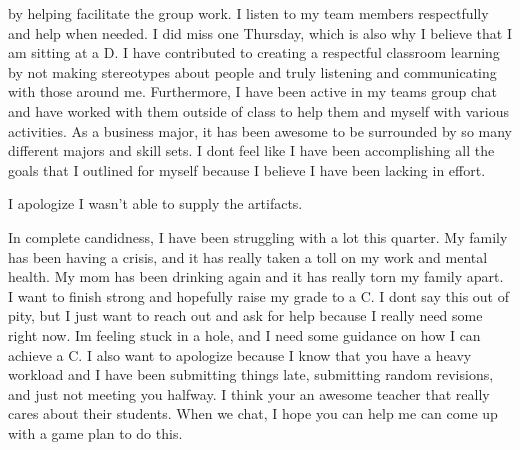 \documentclass[
  letterpaper,
  DIV=11,
  numbers=noendperiod]{scrartcl}
\begin{document}
by helping facilitate the group work. I listen to my team members
respectfully and help when needed. I did miss one Thursday, which is
also why I believe that I am sitting at a D. I have contributed to
creating a respectful classroom learning by not making stereotypes about
people and truly listening and communicating with those around me.
Furthermore, I have been active in my teams group chat and have worked
with them outside of class to help them and myself with various
activities. As a business major, it has been awesome to be surrounded by
so many different majors and skill sets. I don\textquotesingle t feel
like I have been accomplishing all the goals that I outlined for myself
because I believe I have been lacking in effort.

I apologize I wasn't able to supply the artifacts. ~

In complete candidness, I have been struggling with a lot this quarter.
My family has been having a crisis, and it has really taken a toll on my
work and mental health. My mom has been drinking again and it has really
torn my family apart. I want to finish strong and hopefully raise my
grade to a C. I don\textquotesingle t say this out of pity, but I just
want to reach out and ask for help because I really need some right now.
I\textquotesingle m feeling stuck in a hole, and I need some guidance on
how I can achieve a C. I also want to apologize because I know that you
have a heavy workload and I have been submitting things late, submitting
random revisions, and just not meeting you halfway. I think your an
awesome teacher that really cares about their students. When we chat, I
hope you can help me can come up with a game plan to do this.
\end{document}
